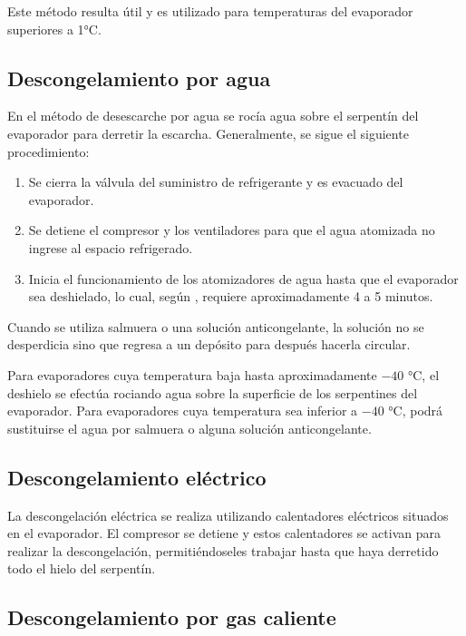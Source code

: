 		Este método resulta útil y es utilizado para temperaturas del evaporador superiores a 1°C.
		
		\subsection{Descongelamiento por agua}
		
		En el método de desescarche por agua se rocía agua sobre el serpentín del evaporador para derretir la escarcha. Generalmente, se sigue el siguiente procedimiento:
		\begin{enumerate}
			\item Se cierra la válvula del suministro de refrigerante y es evacuado del evaporador.
			\item Se detiene el compresor y los ventiladores para que el agua atomizada no ingrese al espacio refrigerado.
			\item Inicia el funcionamiento de los atomizadores de agua hasta que el evaporador sea deshielado, lo cual, según \cite{dossat2004refrigeracion}, requiere aproximadamente 4 a 5 minutos.
		\end{enumerate}
		
		Cuando se utiliza salmuera o una solución anticongelante, la solución no se desperdicia sino que regresa a un depósito para después hacerla circular.	
		
		Para evaporadores cuya temperatura baja hasta aproximadamente $-40$ °C, el deshielo se efectúa rociando agua sobre la superficie de los serpentines del evaporador. Para evaporadores cuya temperatura sea inferior a $-40$ °C, podrá sustituirse el agua por salmuera o alguna solución anticongelante.
		
		\subsection{Descongelamiento eléctrico}
		
		La descongelación eléctrica se realiza utilizando calentadores eléctricos situados en el evaporador. El compresor se detiene y estos calentadores se activan para realizar la descongelación, permitiéndoseles trabajar hasta que haya derretido todo el hielo del serpentín.
		
		\begin{figure}[h]
			\centering
		\end{figure}
		
		\subsection{Descongelamiento por gas caliente}
		
